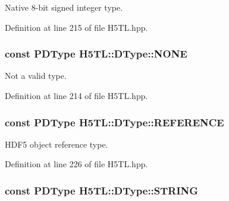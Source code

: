 Native 8-\/bit signed integer type. 



Definition at line 215 of file H5\-T\-L.\-hpp.

\hypertarget{class_h5_t_l_1_1_d_type_a6a438fe2e5e351a7a5f25deb4637f908}{
\subsubsection[{N\-O\-N\-E}]{\setlength{\rightskip}{0pt plus 5cm}const {\bf P\-D\-Type} H5\-T\-L\-::\-D\-Type\-::\-N\-O\-N\-E\hspace{0.3cm}{\ttfamily [static]}}}\label{class_h5_t_l_1_1_d_type_a6a438fe2e5e351a7a5f25deb4637f908}


Not a valid type. 



Definition at line 214 of file H5\-T\-L.\-hpp.

\hypertarget{class_h5_t_l_1_1_d_type_aeec0653c7baf8f9c695d35ac3d5b5457}{
\subsubsection[{R\-E\-F\-E\-R\-E\-N\-C\-E}]{\setlength{\rightskip}{0pt plus 5cm}const {\bf P\-D\-Type} H5\-T\-L\-::\-D\-Type\-::\-R\-E\-F\-E\-R\-E\-N\-C\-E\hspace{0.3cm}{\ttfamily [static]}}}\label{class_h5_t_l_1_1_d_type_aeec0653c7baf8f9c695d35ac3d5b5457}


H\-D\-F5 object reference type. 



Definition at line 226 of file H5\-T\-L.\-hpp.

\hypertarget{class_h5_t_l_1_1_d_type_a261bdb031bcbd6930d09e11c53eb45d3}{
\subsubsection[{S\-T\-R\-I\-N\-G}]{\setlength{\rightskip}{0pt plus 5cm}const {\bf P\-D\-Type} H5\-T\-L\-::\-D\-Type\-::\-S\-T\-R\-I\-N\-G\hspace{0.3cm}{\ttfamily [static]}}}\label{class_h5_t_l_1_1_d_type_a261bdb031bcbd6930d09e11c53eb45d3}



